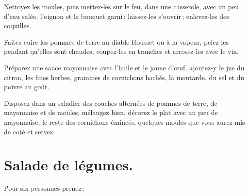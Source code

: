 Nettoyez les moules, puis mettez-les sur le feu, dans une casserole, avec un
peu d'eau salée, l'oignon et le bouquet garni ; laissez-les s'ouvrir ; enlevez-les des
coquilles.

Faites cuire les pommes de terre au diable Rousset ou à la vapeur, pelez-les
pendant qu'elles sont chaudes, coupez-les en tranches et arrosez-les avec le
vin.

Préparez une sauce mayonnaise avec l'huile et le jaune d'œuf, ajoutez-y le jus
du citron, les fines herbes, {\mmm} grammes de cornichons hachés, la
moutarde, du sel et du poivre au goût.

Disposez dans un saladier des couches alternées de pommes de terre, de
mayonnaise et de moules, mélangez bien, décorez le plat avec un peu de
mayonnaise, le reste des cornichons émincés, quelques moules que vous aurez mis
de coté et servez.

\section*{\centering Salade de légumes.}
{}

Pour six personnes prenez :


